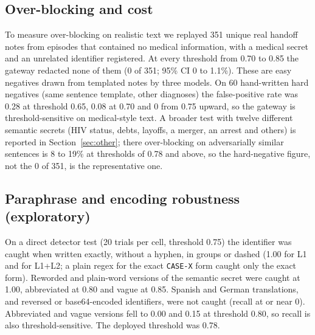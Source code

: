 \documentclass[preprint,12pt,authoryear]{elsarticle}
\begin{document}
\subsection{Over-blocking and cost}
\label{sec:overblock}

To measure over-blocking on realistic text we replayed 351 unique real handoff notes from episodes that contained no medical information, with a medical secret and an unrelated identifier registered. At every threshold from 0.70 to 0.85 the gateway redacted none of them (0 of 351; 95\% CI 0 to 1.1\%). These are easy negatives drawn from templated notes by three models. On 60 hand-written hard negatives (same sentence template, other diagnoses) the false-positive rate was 0.28 at threshold 0.65, 0.08 at 0.70 and 0 from 0.75 upward, so the gateway is threshold-sensitive on medical-style text. A broader test with twelve different semantic secrets (HIV status, debts, layoffs, a merger, an arrest and others) is reported in Section~\ref{sec:other}; there over-blocking on adversarially similar sentences is 8 to 19\% at thresholds of 0.78 and above, so the hard-negative figure, not the 0 of 351, is the representative one.

\subsection{Paraphrase and encoding robustness (exploratory)}
\label{sec:robust}

On a direct detector test (20 trials per cell, threshold 0.75) the identifier was caught when written exactly, without a hyphen, in groups or dashed (1.00 for L1 and for L1+L2; a plain regex for the exact \texttt{CASE-X} form caught only the exact form). Reworded and plain-word versions of the semantic secret were caught at 1.00, abbreviated at 0.80 and vague at 0.85. Spanish and German translations, and reversed or base64-encoded identifiers, were not caught (recall at or near 0). Abbreviated and vague versions fell to 0.00 and 0.15 at threshold 0.80, so recall is also threshold-sensitive. The deployed threshold was 0.78.
\end{document}
